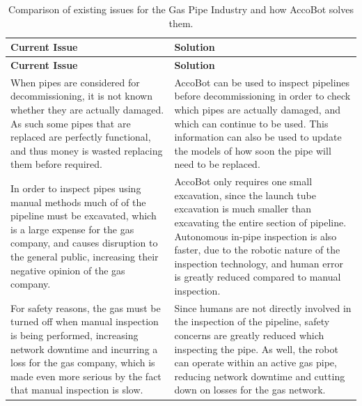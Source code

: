 \documentclass[11pt]{article}		%
\begin{document}
		\setlength{\tabcolsep}{13pt}	%
		\renewcommand{\arraystretch}{1.4}	%
		
		
		\begin{longtable}[c]{| m{} | m{} |}
		
			\hline
			\rowcolor{headerBlue} \textbf{Current Issue} & \textbf{Solution}\\
			\hline
			\endfirsthead

			\hline
			\rowcolor{headerBlue} \textbf{Current Issue} & \textbf{Solution}\\
			\hline
			\endhead
			
			\hline
			\caption{Comparison of existing issues for the Gas Pipe Industry and how AccoBot solves them.}
			\endlastfoot
			
			\hline
			\rowcolor{rowGrey}
			When pipes are considered for decommissioning, it is not known whether they are actually damaged. 
			As such some pipes that are replaced are perfectly functional, and thus money is wasted replacing them before required. 
			& 
			AccoBot can be used to inspect pipelines before decommissioning in order to check which pipes are actually damaged, and which can continue to be used. 
			This information can also be used to update the models of how soon the pipe will need to be replaced.
			\\
			\hline
			\rowcolor{rowGrey}
			In order to inspect pipes using manual methods much of of the pipeline must be excavated, which is a large expense for the gas company, and causes disruption to the general public, increasing their negative opinion of the gas company.
			& 
			AccoBot only requires one small excavation, since the launch tube excavation is much smaller than excavating the entire section of pipeline.
			Autonomous in-pipe inspection is also faster, due to the robotic nature of the inspection technology, and human error is greatly reduced compared to manual inspection.
			\\
			\hline
			\rowcolor{rowGrey}
			For safety reasons, the gas must be turned off when manual inspection is being performed, increasing network downtime and incurring a loss for the gas company, which is made even more serious by the fact that manual inspection is slow.
			&
			Since humans are not directly involved in the inspection of the pipeline, safety concerns are greatly reduced which inspecting the pipe.
			As well, the robot can operate within an active gas pipe, reducing network downtime and cutting down on losses for the gas network.
			

\end{longtable}
\end{document}
